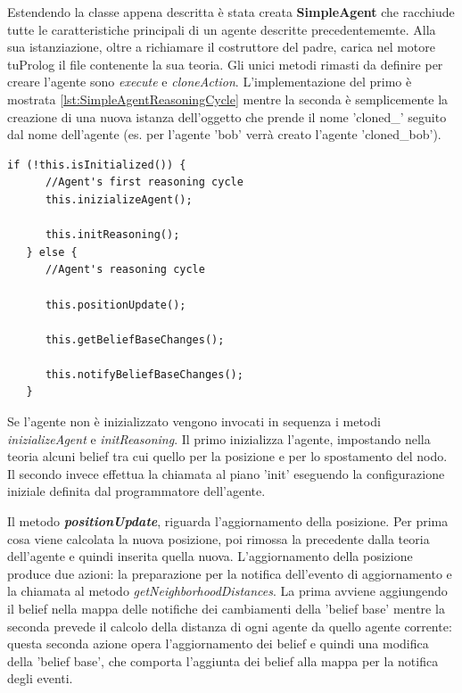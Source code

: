 \documentclass[12pt,a4paper,openright,twoside]{report}
\begin{document}
Estendendo la classe appena descritta \`e stata creata \textbf{SimpleAgent} che racchiude tutte le caratteristiche principali di un agente descritte precedentememte. Alla sua istanziazione, oltre a richiamare il costruttore del padre, carica nel motore tuProlog il file contenente la sua teoria. Gli unici metodi rimasti da definire per creare l'agente sono \textit{execute} e \textit{cloneAction}.
L'implementazione del primo \`e mostrata \ref{lst:SimpleAgentReasoningCycle} mentre la seconda \`e semplicemente la creazione di una nuova istanza dell'oggetto che prende il nome 'cloned\_' seguito dal nome dell'agente (es. per l'agente 'bob' verr\`a creato l'agente 'cloned\_bob').

\medskip
\begin{lstlisting}[firstnumber=1,label={lst:SimpleAgentReasoningCycle},caption={Simple Agent Reasoning Cycle}]
   if (!this.isInitialized()) {
      //Agent's first reasoning cycle
      this.inizializeAgent();

      this.initReasoning();
   } else {
      //Agent's reasoning cycle

      this.positionUpdate();

      this.getBeliefBaseChanges();

      this.notifyBeliefBaseChanges();
   }
\end{lstlisting}

Se l'agente non \`e inizializzato vengono invocati in sequenza i metodi \textit{inizializeAgent} e \textit{initReasoning}. Il primo inizializza l'agente, impostando nella teoria alcuni belief  tra cui quello per la posizione e per lo spostamento del nodo. Il secondo invece effettua la chiamata al piano 'init' eseguendo la configurazione iniziale definita dal programmatore dell'agente.

Il metodo \textbf{\textit{positionUpdate}}, riguarda l'aggiornamento della posizione. Per prima cosa viene calcolata la nuova posizione, poi rimossa la precedente dalla teoria dell'agente e quindi inserita quella nuova. L'aggiornamento della posizione produce due azioni: la preparazione per la notifica dell'evento di aggiornamento e la chiamata al metodo \textit{getNeighborhoodDistances}. La prima avviene aggiungendo il belief nella mappa delle notifiche dei cambiamenti della 'belief base' mentre la seconda prevede il calcolo della distanza di ogni agente da quello agente corrente: questa seconda azione opera l'aggiornamento dei belief e quindi una modifica della 'belief base', che comporta l'aggiunta dei belief alla mappa per la notifica degli eventi.
\end{document}
